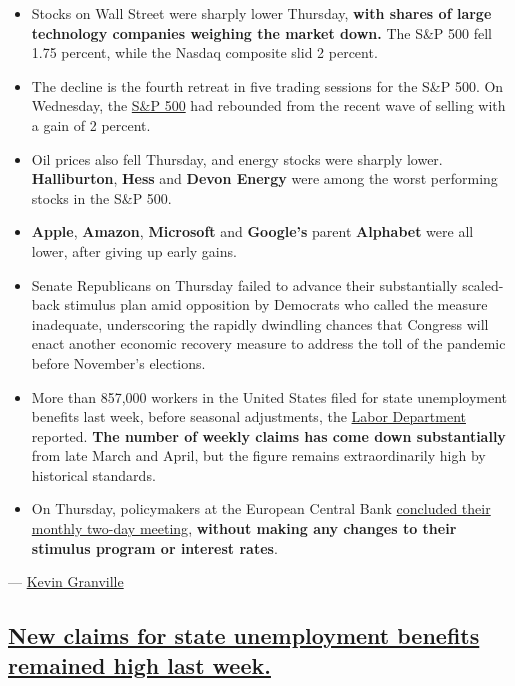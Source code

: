 \begin{itemize}
\item
  Stocks on Wall Street were sharply lower Thursday, \textbf{with shares
  of large technology companies weighing the market down.} The S\&P 500
  fell 1.75 percent, while the Nasdaq composite slid 2 percent.
\item
  The decline is the fourth retreat in five trading sessions for the
  S\&P 500. On Wednesday, the
  \href{https://www.nytimes3xbfgragh.onion/live/2020/09/09/business/stock-market-today-coronavirus/wall-street-rallies-as-tech-rebounds-from-its-10-percent-slide}{S\&P
  500} had rebounded from the recent wave of selling with a gain of 2
  percent.
\item
  Oil prices also fell Thursday, and energy stocks were sharply lower.
  \textbf{Halliburton}, \textbf{Hess} and \textbf{Devon Energy} were
  among the worst performing stocks in the S\&P 500.
\item
  \textbf{Apple}, \textbf{Amazon}, \textbf{Microsoft} and
  \textbf{Google's} parent \textbf{Alphabet} were all lower, after
  giving up early gains.
\item
  Senate Republicans on Thursday failed to advance their substantially
  scaled-back stimulus plan amid opposition by Democrats who called the
  measure inadequate, underscoring the rapidly dwindling chances that
  Congress will enact another economic recovery measure to address the
  toll of the pandemic before November's elections.
\item
  More than 857,000 workers in the United States filed for state
  unemployment benefits last week, before seasonal adjustments, the
  \href{https://www.nytimes3xbfgragh.onion/live/2020/09/10/business/stock-market-today-coronavirus\#new-claims-for-state-unemployment-benefits-remained-high-last-week}{Labor
  Department} reported. \textbf{The number of weekly claims has come
  down substantially} from late March and April, but the figure remains
  extraordinarily high by historical standards.
\item
  On Thursday, policymakers at the European Central Bank
  \href{https://www.nytimes3xbfgragh.onion/2020/09/10/business/ecb-euro.html}{concluded
  their monthly two-day meeting}, \textbf{without making any changes to
  their stimulus program or interest rates}.
\end{itemize}

--- \href{https://www.nytimes3xbfgragh.onion/by/kevin-granville}{Kevin
Granville}

\hypertarget{new-claims-for-state-unemployment-benefits-remained-high-last-week}{%
\subsection{\texorpdfstring{\protect\hyperlink{new-claims-for-state-unemployment-benefits-remained-high-last-week}{New
claims for state unemployment benefits remained high last
week.}}{New claims for state unemployment benefits remained high last week.}}\label{new-claims-for-state-unemployment-benefits-remained-high-last-week}}

